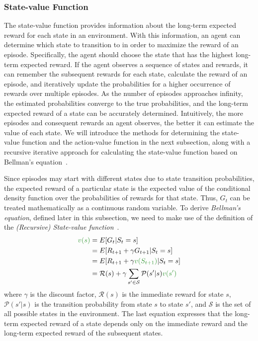 \documentclass[../xlapes02]{subfiles}
\begin{document}
    \subsubsection{State-value Function}\label{subsubsec:state-value-function}
    The state-value function provides information about the long-term expected reward for each state in an environment. With this information, an agent can determine which state to transition to in order to maximize the reward of an episode. Specifically, the agent should choose the state that has the highest long-term expected reward. If the agent observes a sequence of states and rewards, it can remember the subsequent rewards for each state, calculate the reward of an episode, and iteratively update the probabilities for a higher occurrence of rewards over multiple episodes. As the number of episodes approaches infinity, the estimated probabilities converge to the true probabilities, and the long-term expected reward of a state can be accurately determined. Intuitively, the more episodes and consequent rewards an agent observes, the better it can estimate the value of each state. We will introduce the methods for determining the state-value function and the action-value function in the next subsection, along with a recursive iterative approach for calculating the state-value function based on Bellman's equation~\cite{FITMT25127}.

    Since episodes may start with different states due to state transition probabilities, the expected reward of a particular state is the expected value of the conditional density function over the probabilities of rewards for that state. Thus, $G_t$ can be treated mathematically as a continuous random variable.
    To derive \emph{Bellman's equation}, defined later in this subsection, we need to make use of the definition of the \emph{(Recursive) State-value function}~\cite{FITMT25127, rao2022foundations}.
    \begin{equation}
        \label{eq:state-value-function}
        \begin{split}
            \textcolor[RGB]{50,150,50}{v(s)}&=E[G_t|S_t=s]\\
            &=E[R_{t+1}+\gamma G_{t+1}|S_t=s]\\
            &=E[R_{t+1}+\gamma\textcolor[RGB]{50,150,50}{v(S_{t+1})}|S_t=s]\\
            &=\mathcal{R}(s)+\gamma\sum_{s'\in\mathcal{S}}\mathcal{P}(s'|s)\textcolor[RGB]{50,150,50}{v(s')}
        \end{split}
    \end{equation}
    where $\gamma$ is the discount factor, $\mathcal{R}(s)$ is the immediate reward for state $s$, $\mathcal{P}(s'|s)$ is the transition probability from state $s$ to state $s'$, and $\mathcal{S}$ is the set of all possible states in the environment. The last equation expresses that the long-term expected reward of a state depends only on the immediate reward and the long-term expected reward of the subsequent states.
\end{document}

